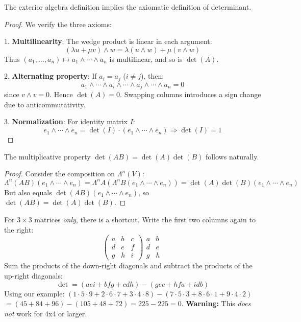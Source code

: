 \documentclass[oneside]{book}
\begin{document}
\begin{theorem}
The exterior algebra definition implies the axiomatic definition of determinant.
\end{theorem}

\begin{proof}
We verify the three axioms:

1. \textbf{Multilinearity}: The wedge product is linear in each argument:
\[
(\lambda u + \mu v) \wedge w = \lambda(u \wedge w) + \mu(v \wedge w)
\]
Thus $(a_1, \ldots, a_n) \mapsto a_1 \wedge \cdots \wedge a_n$ is multilinear, and so is $\det(A)$.

2. \textbf{Alternating property}: If $a_i = a_j$ ($i \neq j$), then:
\[
a_1 \wedge \cdots \wedge a_i \wedge \cdots \wedge a_j \wedge \cdots \wedge a_n = 0
\]
since $v \wedge v = 0$. Hence $\det(A) = 0$. Swapping columns introduces a sign change due to anticommutativity.

3. \textbf{Normalization}: For identity matrix $I$:
\[
e_1 \wedge \cdots \wedge e_n = \det(I) \cdot (e_1 \wedge \cdots \wedge e_n) \Rightarrow \det(I) = 1
\]
\end{proof}

\begin{corollary}
The multiplicative property $\det(AB) = \det(A)\det(B)$ follows naturally.
\end{corollary}

\begin{proof}
Consider the composition on $\Lambda^n(V)$:
\[
\Lambda^n(AB)(e_1 \wedge \cdots \wedge e_n) = \Lambda^nA(\Lambda^nB(e_1 \wedge \cdots \wedge e_n)) = \det(A)\det(B)(e_1 \wedge \cdots \wedge e_n)
\]
But also equals $\det(AB)(e_1 \wedge \cdots \wedge e_n)$, so $\det(AB) = \det(A)\det(B)$.
\end{proof}

\begin{remark}
For $3 \times 3$ matrices \emph{only}, there is a shortcut.
% 
Write the first two columns again to the right:
\[
\begin{pmatrix} a & b & c \\ d & e & f \\ g & h & i \end{pmatrix}
\begin{matrix} a & b \\ d & e \\ g & h \end{matrix}
\]
Sum the products of the down-right diagonals and subtract the products of the up-right diagonals:
\[ \det = (aei + bfg + cdh) - (gec + hfa + idb) \]
Using our example:
$(1\cdot 5\cdot 9 + 2\cdot 6\cdot 7 + 3\cdot 4\cdot 8) - (7\cdot 5\cdot 3 + 8\cdot 6\cdot 1 + 9\cdot 4\cdot 2)$
$= (45 + 84 + 96) - (105 + 48 + 72) = 225 - 225 = 0$.
\textbf{Warning:} This \emph{does not} work for 4x4 or larger.
\end{remark}
\end{document}

